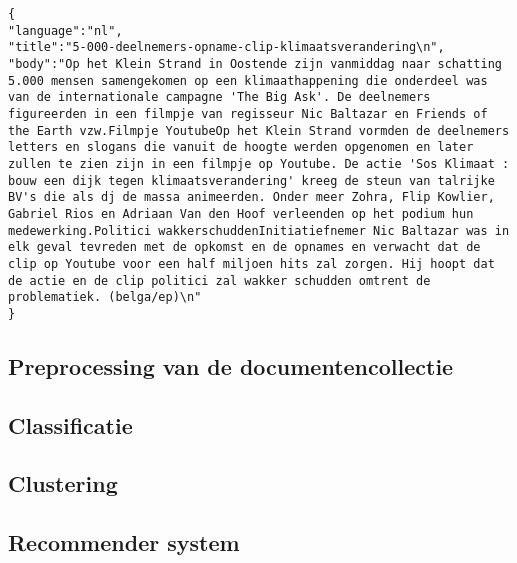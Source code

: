 \begin{lstlisting}
{
"language":"nl",
"title":"5-000-deelnemers-opname-clip-klimaatsverandering\n",
"body":"Op het Klein Strand in Oostende zijn vanmiddag naar schatting 5.000 mensen samengekomen op een klimaathappening die onderdeel was van de internationale campagne 'The Big Ask'. De deelnemers figureerden in een filmpje van regisseur Nic Baltazar en Friends of the Earth vzw.Filmpje YoutubeOp het Klein Strand vormden de deelnemers letters en slogans die vanuit de hoogte werden opgenomen en later zullen te zien zijn in een filmpje op Youtube. De actie 'Sos Klimaat : bouw een dijk tegen klimaatsverandering' kreeg de steun van talrijke BV's die als dj de massa animeerden. Onder meer Zohra, Flip Kowlier, Gabriel Rios en Adriaan Van den Hoof verleenden op het podium hun medewerking.Politici wakkerschuddenInitiatiefnemer Nic Baltazar was in elk geval tevreden met de opkomst en de opnames en verwacht dat de clip op Youtube voor een half miljoen hits zal zorgen. Hij hoopt dat de actie en de clip politici zal wakker schudden omtrent de problematiek. (belga/ep)\n"
}
\end{lstlisting} 


\subsection{Preprocessing van de documentencollectie}

\subsection{Classificatie}

\subsection{Clustering}

\subsection{Recommender system}
